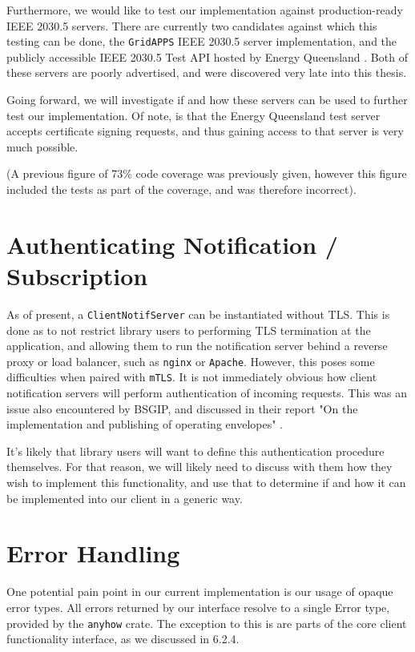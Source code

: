 Furthermore, we would like to test our implementation against production-ready IEEE 2030.5 servers. There are currently two candidates against which this testing can be done, the \texttt{GridAPPS} IEEE 2030.5 server implementation, and the publicly accessible IEEE 2030.5 Test API hosted by Energy Queensland \cite{sep2clienthandbook} \cite{gridapps}. Both of these servers are poorly advertised, and were discovered very late into this thesis.

Going forward, we will investigate if and how these servers can be used to further test our implementation. Of note, is that the Energy Queensland test server accepts certificate signing requests, and thus gaining access to that server is very much possible.

(A previous figure of 73\% code coverage was previously given, however this figure included the tests as part of the coverage, and was therefore incorrect).

\section{Authenticating Notification / Subscription}
As of present, a \texttt{ClientNotifServer} can be instantiated without TLS. This is done as to not restrict library users to performing TLS termination at the application, and allowing them to run the notification server behind a reverse proxy or load balancer, such as \texttt{nginx} or \texttt{Apache}. 
However, this poses some difficulties when paired with \texttt{mTLS}. It is not immediately obvious how client notification servers will perform authentication of incoming requests. This was an issue also encountered  by BSGIP, and discussed in their report "On the implementation and publishing of operating envelopes" \cite{envoyclient}.

It's likely that library users will want to define this authentication  procedure themselves. For that reason, we will likely need to discuss with them how they wish to implement this functionality, and use that to determine if and how it can be implemented into our client in a generic way.

\section{Error Handling}
One potential pain point in our current implementation is our usage of opaque error types. All errors returned by our interface resolve to a single Error type, provided by the \texttt{anyhow} crate. The exception to this is are parts of the core client functionality interface, as we discussed in 6.2.4.

